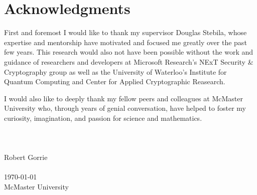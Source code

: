 \cleardoublepage
{}
{}
\chapter*{Acknowledgments}
\vspace{1.0in}
First and foremost I would like to thank my supervisor Douglas Stebila, whose expertise and mentorship have motivated and focused me greatly over the past few years. This research would also not have been possible without the work and guidance of researchers and developers at Microsoft Research's NExT Security \& Cryptography group as well as the University of Waterloo's Institute for Quantum Computing and Center for Applied Cryptographic Reasearch.

I would also like to deeply thank my fellow peers and colleagues at McMaster University who, through years of genial conversation, have helped to foster my curiosity, imagination, and passion for science and mathematics.
\\
\\
\\
\\
Robert Gorrie \\
\\
\today\\
{McMaster University}\\
\newpage
